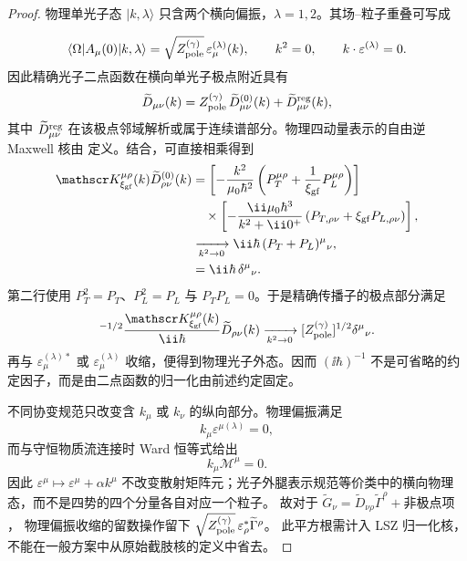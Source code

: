 \begin{proof}
物理单光子态 $|k,\lambda\rangle$ 只含两个横向偏振，$\lambda=1,2$。其场--粒子重叠可写成

\begin{equation*}
 \langle\Omega|A_\mu(0)|k,\lambda\rangle
 =\sqrt{Z_{\rm pole}^{(\gamma)}}\,\varepsilon_\mu^{(\lambda)}(k),
 \qquad
 k^2=0,
 \qquad
 k\cdot\varepsilon^{(\lambda)}=0.
\end{equation*}
因此精确光子二点函数在横向单光子极点附近具有
\begin{equation*}
 \widetilde D_{\mu\nu}(k)
 =Z_{\rm pole}^{(\gamma)}\,\widetilde D^{(0)}_{\mu\nu}(k)
 +\widetilde D^{\rm reg}_{\mu\nu}(k),
\end{equation*}
其中 $\widetilde D^{\rm reg}_{\mu\nu}$ 在该极点邻域解析或属于连续谱部分。物理四动量表示的自由逆 Maxwell 核由 定义。结合，可直接相乘得到
\begin{align*}
 \mathscr K_{\xi_{\rm gf}}^{\mu\rho}(k)
 \widetilde D^{(0)}_{\rho\nu}(k)
 &=\left[-\frac{k^2}{\mu_0\hbar^2}
 \left(P_T^{\mu\rho}+\frac1{\xi_{\rm gf}}P_L^{\mu\rho}\right)\right]\\
 &\quad\times
 \left[-\frac{\ii\mu_0\hbar^3}{k^2+\ii0^+}
 \left(P_{T,\rho\nu}+\xi_{\rm gf}P_{L,\rho\nu}\right)\right],\\
 &\xrightarrow[k^2\to0]{}\ii\hbar\,
 (P_T+P_L)^\mu{}_{\nu},\\
 &=\ii\hbar\,\delta^\mu{}_{\nu}.
\end{align*}
第二行使用 $P_T^2=P_T$、$P_L^2=P_L$ 与 $P_TP_L=0$。于是精确传播子的极点部分满足
\begin{equation*}
 [Z_{\rm pole}^{(\gamma)}]^{-1/2}\frac{\mathscr K_{\xi_{\rm gf}}^{\mu\rho}(k)}{\ii\hbar}
 \widetilde D_{\rho\nu}(k)
 \xrightarrow[k^2\to0]{}
 [Z_{\rm pole}^{(\gamma)}]^{1/2}\delta^\mu{}_{\nu}.
\end{equation*}
再与 $\varepsilon_\mu^{(\lambda)*}$ 或 $\varepsilon_\mu^{(\lambda)}$ 收缩，便得到物理光子外态。因而 $(\ii\hbar)^{-1}$ 不是可省略的约定因子，而是由二点函数的归一化由前述约定固定。

不同协变规范只改变含 $k_\mu$ 或 $k_\nu$ 的纵向部分。物理偏振满足
\begin{equation*}
 k_\mu\varepsilon^{\mu(\lambda)}=0,
\end{equation*}
而与守恒物质流连接时 Ward 恒等式给出
\begin{equation*}
 k_\mu\mathcal M^\mu=0.
\end{equation*}
因此 $\varepsilon^\mu\mapsto\varepsilon^\mu+\alpha k^\mu$ 不改变散射矩阵元；光子外腿表示规范等价类中的横向物理态，而不是四势的四个分量各自对应一个粒子。
故对于 $\widetilde G_\nu=\widetilde D_{\nu\rho}\widetilde\Gamma^\rho+\text{非极点项}$，
物理偏振收缩的留数操作留下 $\sqrt{Z_{\rm pole}^{(\gamma)}}\,\varepsilon_\rho^*\widetilde\Gamma^\rho$。
此平方根需计入 LSZ 归一化核，不能在一般方案中从原始截肢核的定义中省去。

\end{proof}


